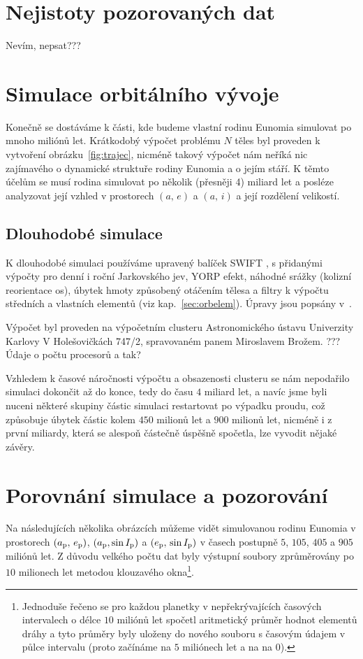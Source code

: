 \documentclass[A4paper, 12pt, oneside]{book}
\begin{document}
\section{Nejistoty pozorovaných dat}
Nevím, nepsat???

\pagebreak
\section{Simulace orbitálního vývoje}
Konečně se dostáváme k části, kde budeme vlastní rodinu Eunomia simulovat po mnoho miliónů let. Krátkodobý výpočet problému $N$ těles byl proveden k vytvoření obrázku~\ref{fig:trajec}, nicméně takový výpočet nám neříká nic zajímavého o dynamické struktuře rodiny Eunomia a o jejím stáří. K těmto účelům se musí rodina simulovat po několik (přesněji 4) miliard let a posléze analyzovat její vzhled v prostorech $(a,\,e)$ a $(a,\,i)$ a její rozdělení velikostí.

\subsection{Dlouhodobé simulace}
K dlouhodobé simulaci používáme upravený balíček SWIFT \cite{levison94}, s přidanými výpočty pro denní i roční Jarkovského jev, YORP efekt, náhodné srážky (kolizní reorientace os), úbytek hmoty způsobený otáčením tělesa a filtry k výpočtu středních a vlastních elementů (viz kap.~\ref{sec:orbelem}). Úpravy jsou popsány v~\cite{broz11}.

Výpočet byl proveden na výpočetním clusteru Astronomického ústavu Univerzity Karlovy V Holešovičkách 747/2, spravovaném panem Miroslavem Brožem. ??? Údaje o počtu procesorů a tak?

Vzhledem k časové náročnosti výpočtu a obsazenosti clusteru se nám nepodařilo simulaci dokončit až do konce, tedy do času $4$ miliard let, a navíc jsme byli nuceni některé skupiny částic simulaci restartovat po výpadku proudu, což způsobuje úbytek částic kolem $450$ milionů let a $900$ milionů let, nicméně i z první miliardy, která se alespoň částečně úspěšně spočetla, lze vyvodit nějaké závěry. 

\pagebreak
\section{Porovnání simulace a pozorování}

Na následujících několika obrázcích můžeme vidět simulovanou rodinu Eunomia v prostorech $(a_{\rm p},\,e_{\rm p})$, $(a_{\rm p}, \sin I_{\rm p})$ a $(e_{\rm p},\,\sin I_{\rm p})$ v časech postupně $5$, $105$, $405$ a $905$ miliónů let. Z důvodu velkého počtu dat byly výstupní soubory zprůměrovány po $10$ milionech let metodou klouzavého okna\footnote{Jednoduše řečeno se pro každou planetky v nepřekrývajících časových intervalech o délce $10$ miliónů let spočetl aritmetický průměr hodnot elementů dráhy a tyto průměry byly uloženy do nového souboru s časovým údajem v půlce intervalu (proto začínáme na $5$ miliónech let a na na $0$).}.
\end{document}
